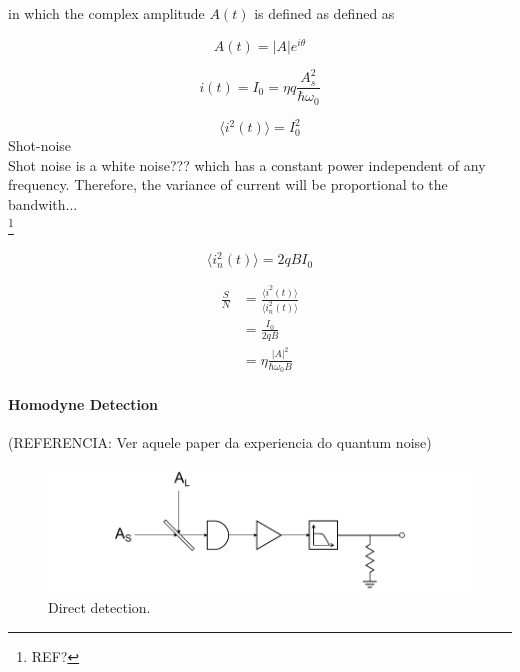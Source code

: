 in which the complex amplitude $A(t)$ is defined as defined as 

\begin{equation}
	A(t) = |A| e^{i \theta}
\end{equation}

\begin{equation}
	i(t) = I_0 = \eta q \frac{A_s^2}{\hbar \omega_0}
\end{equation}

\begin{equation}
	\langle i^2(t) \rangle = I_0^2
\end{equation}
Shot-noise\\

Shot noise is a white noise??? which has a constant power independent of any frequency. Therefore, the variance of current will be proportional to the bandwith...\\
\footnote{REF?}

\begin{equation}
	\langle i_n^2(t) \rangle = 2 q B I_0
\end{equation}


\begin{align}
	\frac{S}{N} &= \frac{\langle i^2(t) \rangle}{\langle i_n^2(t) \rangle} \nonumber\\
                &= \frac{I_0}{2 q B}\nonumber\\
                &= \eta \frac{ |A|^2}{\hbar \omega_0 B}
\end{align}


\paragraph{Homodyne Detection}

(REFERENCIA: Ver aquele paper da experiencia do quantum noise)\\
\begin{figure}[H]
	\centering
	\includegraphics{./sdf/quantum_noise/figures/detection-homodyne.pdf}
	\caption{Direct detection.}
\end{figure}
